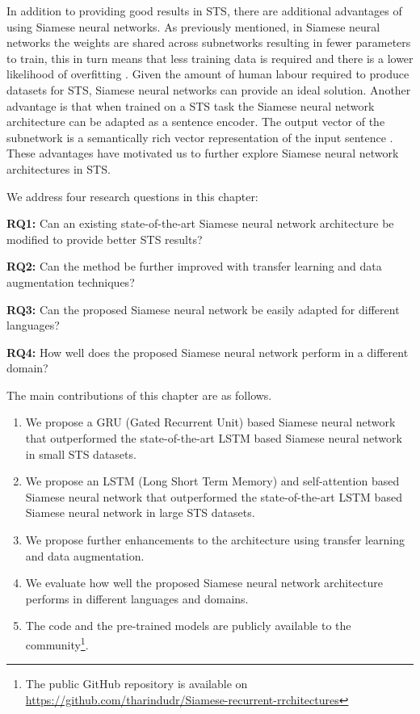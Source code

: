 In addition to providing good results in STS, there are additional advantages of using Siamese neural networks. As previously mentioned, in Siamese neural networks the weights are shared across subnetworks resulting in fewer parameters to train, this in turn means that less training data is required and there is a lower likelihood of overfitting  \autocite{ranasinghe-etal-2019-semantic}. Given the amount of human labour required to produce datasets for STS, Siamese neural networks can provide an ideal solution. Another advantage is that when trained on a STS task the Siamese neural network architecture can be adapted as a sentence encoder. The output vector of the subnetwork is a semantically rich vector representation of the input sentence \autocite{Mueller_Thyagarajan_2016}. These advantages have motivated us to further explore Siamese neural network architectures in STS. 


We address four research questions in this chapter:

\textbf{RQ1:} Can an existing state-of-the-art Siamese neural network architecture be modified to provide better STS results?

\textbf{RQ2:} Can the method be further improved with transfer learning and data augmentation techniques?

\textbf{RQ3:} Can the proposed Siamese neural network be easily adapted for different languages?

\textbf{RQ4:} How well does the proposed Siamese neural network perform in a different domain? 


The main contributions of this chapter are as follows.

\begin{enumerate}
	\item We propose a GRU (Gated Recurrent Unit) based Siamese neural network that outperformed the state-of-the-art LSTM based Siamese neural network in small STS datasets. 
	
	\item We propose an LSTM (Long Short Term Memory) and self-attention based Siamese neural network that outperformed the state-of-the-art LSTM based Siamese neural network in large STS datasets.
	
	\item We propose further enhancements to the architecture using transfer learning and data augmentation.  
	
	\item We evaluate how well the proposed Siamese neural network architecture performs in different languages and domains. 
	
	\item The code and the pre-trained models are publicly available to the community\footnote{The public GitHub repository is available on \url{https://github.com/tharindudr/Siamese-recurrent-rrchitectures}}.
\end{enumerate}


